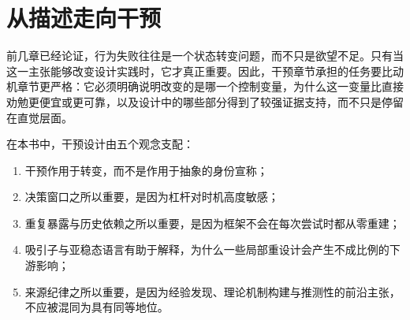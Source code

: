 \section{从描述走向干预}

前几章已经论证，行为失败往往是一个状态转变问题，而不只是欲望不足。只有当这一主张能够改变设计实践时，它才真正重要。因此，干预章节承担的任务要比动机章节更严格：它必须明确说明改变的是哪一个控制变量，为什么这一变量比直接劝勉更便宜或更可靠，以及设计中的哪些部分得到了较强证据支持，而不只是停留在直觉层面。

在本书中，干预设计由五个观念支配：
\begin{enumerate}[nosep]
  \item 干预作用于转变，而不是作用于抽象的身份宣称；
  \item 决策窗口之所以重要，是因为杠杆对时机高度敏感；
  \item 重复暴露与历史依赖之所以重要，是因为框架不会在每次尝试时都从零重建；
  \item 吸引子与亚稳态语言有助于解释，为什么一些局部重设计会产生不成比例的下游影响；
  \item 来源纪律之所以重要，是因为经验发现、理论机制构建与推测性的前沿主张，不应被混同为具有同等地位。
\end{enumerate}